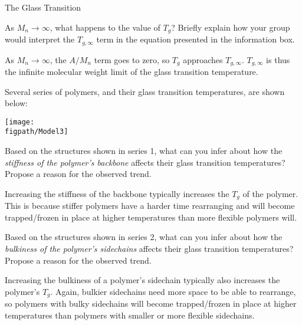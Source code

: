 \begin{activity}{The Glass Transition}
\begin{ctqs}
	\question As $M_n\to\infty$, what happens to the value of $T_g$?  Briefly explain how your group would interpret the $T_{g,\infty}$ term in the equation presented in the information box.
	
		\begin{solution}[1in]
			As $M_n\to\infty$, the $A/M_n$ term goes to zero, so $T_g$ approaches $T_{g,\infty}$.  $T_{g,\infty}$ is thus the infinite molecular weight limit of the glass transition temperature.
		\end{solution}
	
\end{ctqs}

\clearpage
\begin{model}
	\label{\labelbase:mdl:Tgdeterminants}

	Several series of polymers, and their glass transition temperatures, are shown below:
	
	\centerline{\texttt{[image: \\figpath/Model3]}}
	
\end{model}

\begin{ctqs}
	
	\question Based on the structures shown in series 1, what can you infer about how the \emph{stiffness of the polymer's backbone} affects their glass transition temperatures?  Propose a reason for the observed trend.
	
		\begin{solution}[0.75in]
			Increasing the stiffness of the backbone typically increases the $T_g$ of the polymer.  This is because stiffer polymers have a harder time rearranging and will become trapped/frozen in place at higher temperatures than more flexible polymers will.
		\end{solution}
	

	\question Based on the structures shown in series 2, what can you infer about how the \emph{bulkiness of the polymer's sidechains} affects their glass transition temperatures?  Propose a reason for the observed trend.
	
		\begin{solution}[0.75in]
			Increasing the bulkiness of a polymer's sidechain typically also increases the polymer's $T_g$.  Again, bulkier sidechains need more space to be able to rearrange, so polymers with bulky sidechains will become trapped/frozen in place at higher temperatures than polymers with smaller or more flexible sidechains.
		\end{solution}
	

\end{ctqs}
\end{activity}

